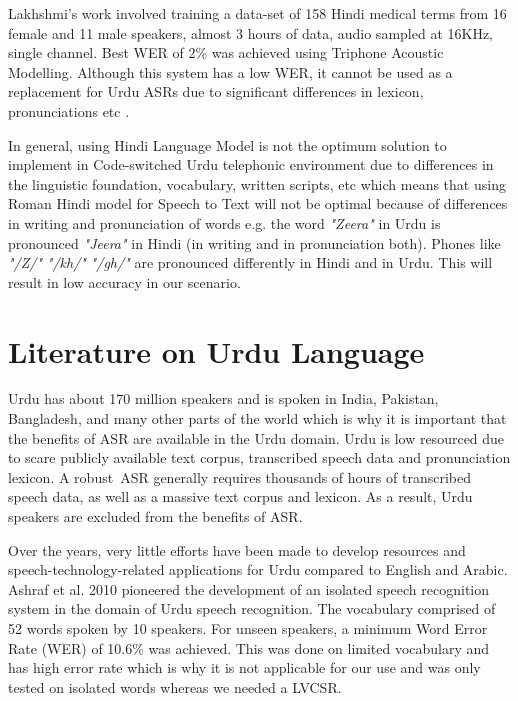Lakhshmi's \cite{lakshmi_sri_kaldi_2020} work involved training a data-set of 158 Hindi medical terms from 16 female and 11 male speakers, almost 3 hours of data, audio sampled at 16KHz, single channel. Best WER of 2\% was achieved using Triphone Acoustic Modelling. Although this system has a low WER, it cannot be used as a replacement for Urdu ASRs due to significant differences in lexicon, pronunciations etc \cite{k_v_s_parsad_and_s_m_virk_computational_2012}.

In general, using Hindi Language Model is not the optimum solution to implement in Code-switched Urdu telephonic environment due to differences in the linguistic foundation, vocabulary, written scripts, etc which means that using Roman Hindi model for Speech to Text will not be optimal because of differences in writing and pronunciation of words e.g. the word \textit{"Zeera"} in Urdu is pronounced \textit{"Jeera"} in Hindi (in writing and in pronunciation both). Phones like \textit{"/Z/"} \textit{"/kh/"} \textit{"/gh/"} are pronounced differently in Hindi and in Urdu. This will result in low accuracy in our scenario.

\section{Literature on Urdu Language}

Urdu has about 170 million speakers \cite{ethnologue_urdu_nodate} and is spoken in India, Pakistan, Bangladesh, and many other parts of the world which is why it is important that the benefits of ASR are available in the Urdu domain. Urdu is low resourced due to scare publicly available text corpus, transcribed speech data and pronunciation lexicon. A robust ASR generally requires thousands of hours of transcribed speech data, as well as a massive text corpus and lexicon. As a result, Urdu speakers are excluded from the benefits of ASR. 

Over the years, very little efforts have been made to develop resources and speech-technology-related applications for Urdu compared to English and Arabic. Ashraf et al. 2010 \cite{hutchison_speaker_2010} pioneered the development of an isolated speech recognition system in the domain of Urdu speech recognition. The vocabulary comprised of 52 words spoken by 10 speakers. For unseen speakers, a minimum Word Error Rate (WER) of 10.6\% was achieved. This was done on limited vocabulary and has high error rate which is why it is not applicable for our use and was only tested on isolated words whereas we needed a LVCSR.

